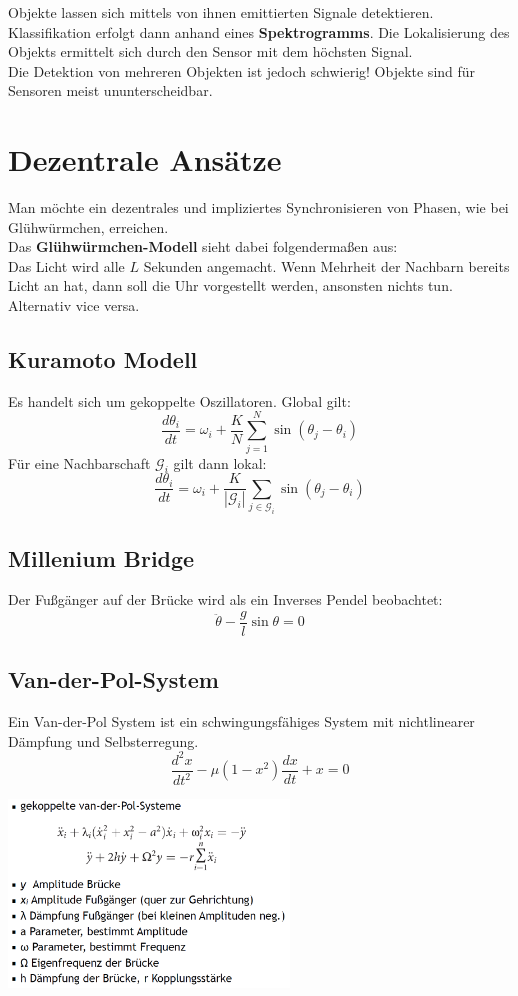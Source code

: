 \documentclass[a4paper]{article}
\begin{document}
Objekte lassen sich mittels von ihnen emittierten Signale detektieren. Klassifikation erfolgt dann anhand eines \textbf{Spektrogramms}. Die Lokalisierung des Objekts ermittelt sich durch den Sensor mit dem höchsten Signal.\\

Die Detektion von mehreren Objekten ist jedoch schwierig! Objekte sind für Sensoren meist ununterscheidbar.

\section{Dezentrale Ansätze}
Man möchte ein dezentrales und impliziertes Synchronisieren von Phasen, wie bei Glühwürmchen, erreichen.\\

Das \textbf{Glühwürmchen-Modell} sieht dabei folgendermaßen aus:\\
Das Licht wird alle $L$ Sekunden angemacht. Wenn Mehrheit der Nachbarn bereits Licht an hat, dann soll die Uhr vorgestellt werden, ansonsten nichts tun. Alternativ vice versa.

\subsection{Kuramoto Modell}
Es handelt sich um gekoppelte Oszillatoren. Global gilt:
$$\dfrac{d \theta_i}{dt} = \omega_i+\dfrac{K}{N}\sum_{j=1}^{N}\sin(\theta_j-\theta_i)$$ 
Für eine Nachbarschaft $\mathcal{G}_i$ gilt dann lokal:
$$\dfrac{d \theta_i}{dt} = \omega_i+\dfrac{K}{|\mathcal{G}_i|}\sum_{j\in \mathcal{G}_i}\sin(\theta_j-\theta_i)$$ 
\subsection{Millenium Bridge}
Der Fußgänger auf der Brücke wird als ein Inverses Pendel beobachtet:
$$\ddot{\theta}-\dfrac{g}{l}\sin\theta = 0$$
\subsection{Van-der-Pol-System}
Ein Van-der-Pol System ist ein schwingungsfähiges System mit nichtlinearer Dämpfung und Selbsterregung.
$$\dfrac{d^2x}{dt^2}-\mu (1-x^2)\dfrac{dx}{dt}+x = 0$$
\begin{center}
	\includegraphics[height = 5cm]{VDP.png}
\end{center}
\end{document}
